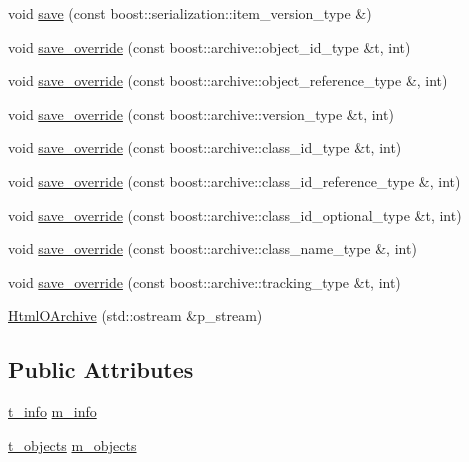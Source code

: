 \begin{DoxyCompactItemize}
\item 
void \hyperlink{classxtd_1_1servers_1_1app_1_1HtmlOArchive_afae32c6090882adc5a310a9ba9297c12}{save} (const boost\-::serialization\-::item\-\_\-version\-\_\-type \&)
\item 
void \hyperlink{classxtd_1_1servers_1_1app_1_1HtmlOArchive_a0cd8f9056f209afd354f74073436b70e}{save\-\_\-override} (const boost\-::archive\-::object\-\_\-id\-\_\-type \&t, int)
\item 
void \hyperlink{classxtd_1_1servers_1_1app_1_1HtmlOArchive_add8049c6091432811543e5288706c3c9}{save\-\_\-override} (const boost\-::archive\-::object\-\_\-reference\-\_\-type \&, int)
\item 
void \hyperlink{classxtd_1_1servers_1_1app_1_1HtmlOArchive_a1afeaad47abf3aff1f91b5faa94f869b}{save\-\_\-override} (const boost\-::archive\-::version\-\_\-type \&t, int)
\item 
void \hyperlink{classxtd_1_1servers_1_1app_1_1HtmlOArchive_adbb73e26344036aa3c370bd1a133bf70}{save\-\_\-override} (const boost\-::archive\-::class\-\_\-id\-\_\-type \&t, int)
\item 
void \hyperlink{classxtd_1_1servers_1_1app_1_1HtmlOArchive_aa2bce7ac03f460426a47e25463212908}{save\-\_\-override} (const boost\-::archive\-::class\-\_\-id\-\_\-reference\-\_\-type \&, int)
\item 
void \hyperlink{classxtd_1_1servers_1_1app_1_1HtmlOArchive_a10cb86717b8b49afd68e5b6120662ce9}{save\-\_\-override} (const boost\-::archive\-::class\-\_\-id\-\_\-optional\-\_\-type \&t, int)
\item 
void \hyperlink{classxtd_1_1servers_1_1app_1_1HtmlOArchive_a3238b152ed11274e09c1b0c5995b62c6}{save\-\_\-override} (const boost\-::archive\-::class\-\_\-name\-\_\-type \&, int)
\item 
void \hyperlink{classxtd_1_1servers_1_1app_1_1HtmlOArchive_a62245e0fd68d61841e8e8f34922e5588}{save\-\_\-override} (const boost\-::archive\-::tracking\-\_\-type \&t, int)
\item 
\hyperlink{classxtd_1_1servers_1_1app_1_1HtmlOArchive_a7bf5587951c58ae1652bb73143e41fbc}{Html\-O\-Archive} (std\-::ostream \&p\-\_\-stream)
\end{DoxyCompactItemize}
\subsection*{Public Attributes}
\begin{DoxyCompactItemize}
\item 
\hyperlink{classxtd_1_1servers_1_1app_1_1HtmlOArchive_aedb461454d0c255709664fcccc379cf5}{t\-\_\-info} \hyperlink{classxtd_1_1servers_1_1app_1_1HtmlOArchive_a03bd854507f8457a3b5b575203108ff7}{m\-\_\-info}
\item 
\hyperlink{classxtd_1_1servers_1_1app_1_1HtmlOArchive_a0409a4336819121b7ec0d402ffca9cdf}{t\-\_\-objects} \hyperlink{classxtd_1_1servers_1_1app_1_1HtmlOArchive_a69e333ff9b2b0743e14976cfa4afd6d2}{m\-\_\-objects}
\end{DoxyCompactItemize}
